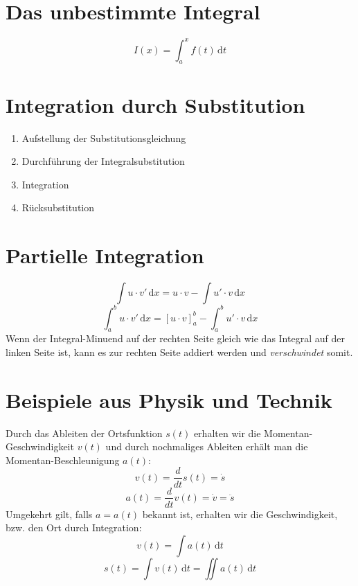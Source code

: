 \documentclass[a4paper,DIV10,12pt,headsepline,smallheadings,halfparskip-]{scrreprt}
\begin{document}
	\section{Das unbestimmte Integral} %
	\label{sec:das_unbestimmte_integral}
	\[ I(x) = \int_a^x f(t)\,\mathrm{d}t \]
	
	\section{Integration durch Substitution} %
	\label{sec:integration_durch_substitution}
	\begin{enumerate}
		\item Aufstellung der Substitutionsgleichung
		\item Durchführung der Integralsubstitution
		\item Integration
		\item Rücksubstitution
	\end{enumerate}
	
	\section{Partielle Integration} %
	\label{sec:partielle_integration}
	\[ \int u \cdot v'\,\mathrm{d}x = u \cdot v - \int u' \cdot v\,\mathrm{d}x \]
	\[ \int_a^b u \cdot v'\,\mathrm{d}x = [u \cdot v]_a^b - \int_a^b u' \cdot v\,\mathrm{d}x \]
 	Wenn der Integral-Minuend auf der rechten Seite gleich wie das Integral auf der linken Seite ist, kann es zur rechten Seite addiert werden und \emph{verschwindet} somit.

	\section{Beispiele aus Physik und Technik} %
	\label{sec:beispiele_aus_physik_und_technik}
	Durch das Ableiten der Ortsfunktion \( s(t) \) erhalten wir die Momentan-Geschwindigkeit \(v(t)\) und durch nochmaliges Ableiten erhält man die Momentan-Beschleunigung \(a(t)\):
	\[ v(t) = \frac { d }{ dt } s(t) = \dot { s } \]
	\[ a(t) = \frac { d }{ dt } v(t) = \dot { v } = \ddot{s}\]
	Umgekehrt gilt, falls \( a = a(t) \) bekannt ist, erhalten wir die Geschwindigkeit, bzw. den Ort durch Integration:
	\[ v(t) = \int a(t)\,\mathrm{d}t \]
	\[ s(t) = \int v(t)\,\mathrm{d}t = \iint a(t)\,\mathrm{d}t\]
	
	
\end{document}
